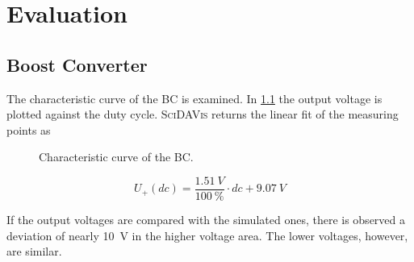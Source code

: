 \chapter{Evaluation}
%
\section{Boost Converter}
    The characteristic curve of the BC is examined. In \cref{fig:characteristic-curve-of-the-boost-converter}
    the output voltage is plotted against the duty cycle. \textsc{SciDAVis} returns the linear fit of the measuring points as\par
    \begin{figure}[h]
        \centering
        
        \caption[Characteristic curve of the BC]{Characteristic curve of the BC.}
        \label{fig:characteristic-curve-of-the-boost-converter}
    \end{figure}
    \begin{equation}
        U_{+}(dc)=\frac{\SI{1.51}{V}}{\SI{100}{\percent}} \cdot dc + \SI{9.07}{V}
    \end{equation}\par
    If the output voltages are compared with the simulated ones, there is observed a deviation of nearly \SI{10}{V} in the
    higher voltage area. The lower voltages, however, are similar.\par
